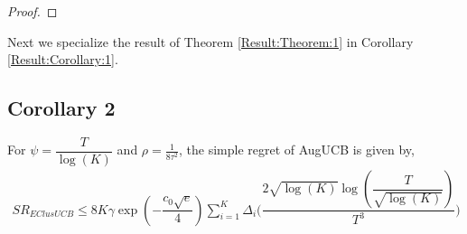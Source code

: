 \begin{proof}
%
%
%
%
%
%
%
%
%
%

\end{proof}

	Next we specialize the result of Theorem \ref{Result:Theorem:1} in Corollary \ref{Result:Corollary:1}.

\subsection{Corollary 2}


\begin{corollary}
\label{Result:Corollary:1}
For $\psi=\dfrac{T}{\log (K)}$ and $\rho=\frac{1}{8\tau^{2}}$, the simple regret of AugUCB is given by,
\begin{align*}
SR_{EClusUCB} \leq  8K \gamma \exp(-\dfrac{c_{0}\sqrt{e}}{4}) \sum_{i=1}^{K} \Delta_{i}  \bigg(\dfrac{2 \sqrt{\log (K)} \log (\dfrac{T}{\sqrt{\log (K)}} )}{T^{3}}\bigg)
\end{align*}
\end{corollary}

